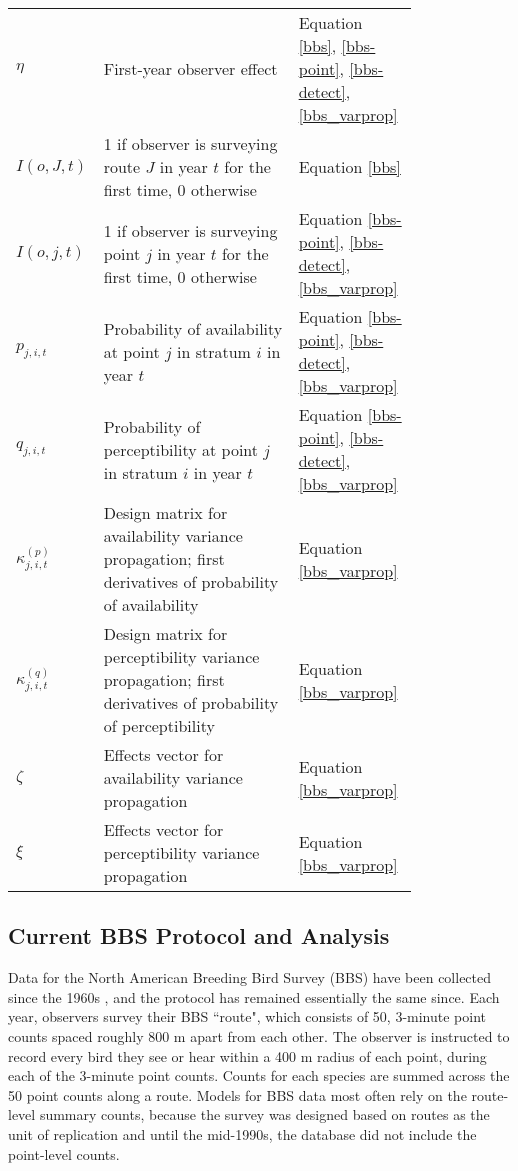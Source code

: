 \begin{table}[!ht]
\begin{tabular}[t]{l>{\raggedright}p{0.5\linewidth}>{\raggedright\arraybackslash}p{0.3\linewidth}}
		$\eta$&First-year observer effect&Equation \ref{bbs}, \ref{bbs-point}, \ref{bbs-detect}, \ref{bbs_varprop}\\
		$I(o,J,t)$&1 if observer is surveying route $J$ in year $t$ for the first time, 0 otherwise&Equation \ref{bbs}\\
		$I(o,j,t)$&1 if observer is surveying point $j$ in year $t$ for the first time, 0 otherwise&Equation \ref{bbs-point}, \ref{bbs-detect}, \ref{bbs_varprop}\\
		$p_{j,i,t}$&Probability of availability at point $j$ in stratum $i$ in year $t$&Equation \ref{bbs-point}, \ref{bbs-detect}, \ref{bbs_varprop}\\
		$q_{j,i,t}$&Probability of perceptibility at point $j$ in stratum $i$ in year $t$&Equation \ref{bbs-point}, \ref{bbs-detect}, \ref{bbs_varprop}\\
		$\kappa_{j,i,t}^{(p)}$&Design matrix for availability variance propagation; first derivatives of probability of availability \citep{bravington_variance_2021}&Equation \ref{bbs_varprop}\\
		$\kappa_{j,i,t}^{(q)}$&Design matrix for perceptibility variance propagation; first derivatives of probability of perceptibility \citep{bravington_variance_2021}&Equation \ref{bbs_varprop}\\
		$\zeta$&Effects vector for availability variance propagation \citep{bravington_variance_2021}&Equation \ref{bbs_varprop}\\
		$\xi$&Effects vector for perceptibility variance propagation \citep{bravington_variance_2021}&Equation \ref{bbs_varprop}\\
		\hline
	\end{tabular}
\end{table}%

\subsection{Current BBS Protocol and Analysis}\label{current-bbs}

\par Data for the North American Breeding Bird Survey (BBS) have been collected since the 1960s \citep{hudson_role_2017, sauer_first_2017}, and the protocol has remained essentially the same since. 
Each year, observers survey their BBS ``route", which consists of 50, 3-minute point counts spaced roughly 800 m apart from each other. 
The observer is instructed to record every bird they see or hear within a 400 m radius of each point, during each of the 3-minute point counts. 
Counts for each species are summed across the 50 point counts along a route.
Models for BBS data most often rely on the route-level summary counts, because the survey was designed based on routes as the unit of replication and until the mid-1990s, the database did not include the point-level counts.

